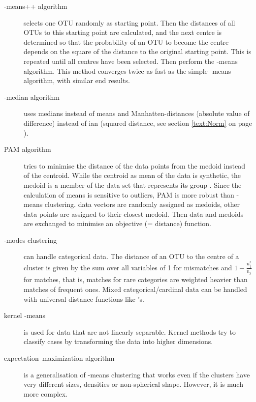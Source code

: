 \begin{refsection}
\begin{description}
  \item[-means++ algorithm]{selects one \acs{OTU} randomly as starting point. Then the distances of all \acs{OTU}s to this starting point are calculated, and the next centre is determined so that the probability of an \acs{OTU} to become the centre depends on the square of the distance to the original starting point. This is repeated until all  centres have been selected. Then perform the -means algorithm. This method converges twice as fast as the simple -means algorithm, with similar end results.}
  \item[-median algorithm]{uses medians instead of means and Manhatten-distances  (absolute value of difference) instead of ian  (squared distance, see section \ref{text:Norm} on page \pageref{text:Norm}).}
  \item[\acf{PAM} algorithm]{tries to minimise the distance of the data points from the medoid instead of the centroid. While the centroid as mean of the data is synthetic, the medoid is a member of the data set that represents its group \parencite{Kau-90}. Since the calculation of means is sensitive to outliers, \acs{PAM} is more robust than -means clustering.  data vectors are randomly assigned as medoids, other data points are assigned to their closest medoid. Then data and medoids are exchanged to minimise an objective (= distance) function.}
  \item[-modes clustering]{can handle categorical data. The distance of an \acs{OTU} to the centre of a cluster is given by the sum over all  variables of 1 for mismatches and \( 1 - \frac{n^r_j}{n_j} \) for matches, that is, matches for rare categories are weighted heavier than matches of frequent ones. Mixed categorical/cardinal data can be handled with universal distance functions like 's. }
  \item[kernel -means]{is used for data that are not linearly separable. Kernel methods try to classify cases by transforming the data into higher dimensions. }
  \item[expectation–maximization algorithm]{is a generalisation of -means clustering that works even if the clusters have very different sizes, densities or non-spherical shape. However, it is much more complex.}
\end{description}



\end{refsection}
